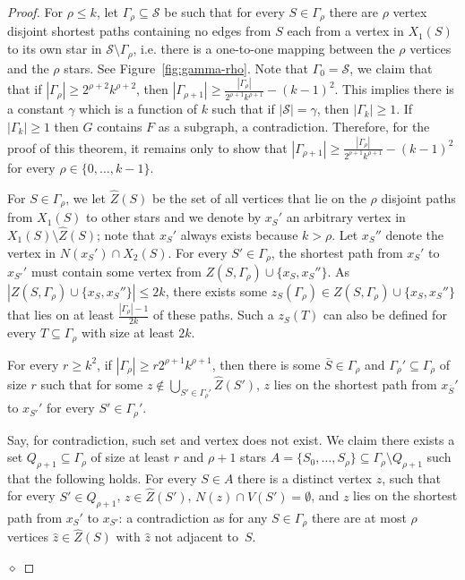 \documentclass[runningheads,envcountsame]{llncs}
\newcommand{\forbiddenGraph}{F}
\newenvironment{claimproof}
{\noindent {\em Proof of Claim:} }
{\hfill $\diamond$ \smallskip}
\begin{document}
\begin{proof}
  For $\rho \leq k$, let $\Gamma_{\rho} \subseteq \mathcal{S}$ be
  such that for every $S \in \Gamma_{\rho}$ there are $\rho$ vertex
  disjoint shortest paths containing no edges from $S$ each from a
  vertex in $X_1(S)$ to its own star in $\mathcal{S} \setminus
  \Gamma_{\rho}$, i.e. there is a one-to-one mapping between the
  $\rho$ vertices and the $\rho$ stars. See Figure~\ref{fig:gamma-rho}. Note that
  $\Gamma_0=\mathcal{S}$, we claim that that if 
  $|\Gamma_{\rho}| \geq 2^{\rho+2}k^{\rho+2}$, then
  $|\Gamma_{\rho+1}|\geq \frac{|\Gamma_{\rho}|}{2^{\rho+1}k^{\rho+1}}-(k-1)^2$. This implies there is a
  constant $\gamma$ which is a function of $k$ such that if $|\mathcal{S}| = \gamma$, then $|\Gamma_k|\geq 1$. If $|\Gamma_k|\geq 1$ then $G$ contains $\forbiddenGraph$ as a subgraph, a contradiction. Therefore, for the proof of this theorem, it remains only to show that $|\Gamma_{\rho+1}|\geq \frac{|\Gamma_{\rho}|}{2^{\rho+1}k^{\rho+1}}-(k-1)^2$ for every $\rho \in \{0,\dotsc,k-1\}$.
  
  For $S \in \Gamma_{\rho}$, we let $\hat{Z}(S)$ be the set of
  all vertices that lie on the $\rho$ disjoint paths from $X_1(S)$
  to other stars and we denote by $x_{S}'$ an arbitrary vertex in
  $X_1(S)\setminus \hat{Z}(S)$; note that $x_S'$ always exists
  because $k> \rho$. Let $x_{S}''$ denote the vertex in
  $N(x_S') \cap X_2(S)$. For every $S' \in \Gamma_{\rho}$, the shortest
  path from $x_S'$ to $x_{S'}'$ must contain some vertex from
  $Z(S,\Gamma_{\rho}) \cup \{x_S, x_S''\}$. As
  $|Z(S,\Gamma_{\rho}) \cup \{x_S, x_S''\}|\leq 2k$, there exists some
  $z_{S}(\Gamma_{\rho}) \in Z(S,\Gamma_{\rho}) \cup \{x_S, x_S''\}$ that
  lies on at least $\frac{|\Gamma_{\rho}|-1}{2k}$ of these paths.
  Such a $z_{S}(T)$ can also be defined for every
  $T \subseteq \Gamma_{\rho}$ with size at least $2k$.

  \begin{mclaim}\label{claim-z0}
    For every $r \geq k^2$, if $|\Gamma_\rho| \geq r2^{\rho+1}k^{\rho+1}$, then
    there is some $\bar{S} \in \Gamma_\rho$ and $\Gamma_\rho'\subseteq
    \Gamma_\rho$ of size $r$ such that for some
    $z \notin \bigcup_{S' \in \Gamma_\rho'}\hat{Z}(S')$, $z$ lies on
    the shortest path from $x_{\bar{S}}'$ to $x_{S'}'$ for every
    $S' \in \Gamma_\rho'$.
  \end{mclaim}
  \begin{claimproof}
      Say, for contradiction, such set and vertex does not exist.
      We claim there exists a set $Q_{\rho+1} \subseteq \Gamma_\rho$
      of size at least $r$ and $\rho+1$ stars
      $A = \{S_0, \ldots, S_{\rho}\} \subseteq \Gamma_\rho \setminus
      Q_{\rho+1}$ such that the following holds.
      For every $S \in A$ there is a distinct vertex $z$, such that for every
      $S' \in Q_{\rho+1}$, $z \in \hat{Z}(S')$,
      $N(z) \cap V(S') = \emptyset$, and $z$ lies on the shortest path
      from $x_S'$ to $x_{S'}$: a contradiction as for any
      $S \in \Gamma_\rho$ there are at most $\rho$ vertices $\hat{z} \in \hat{Z}(S)$
      with $\hat{z}$ not adjacent to~$S$.


\end{claimproof}
\end{proof}
\end{document}
